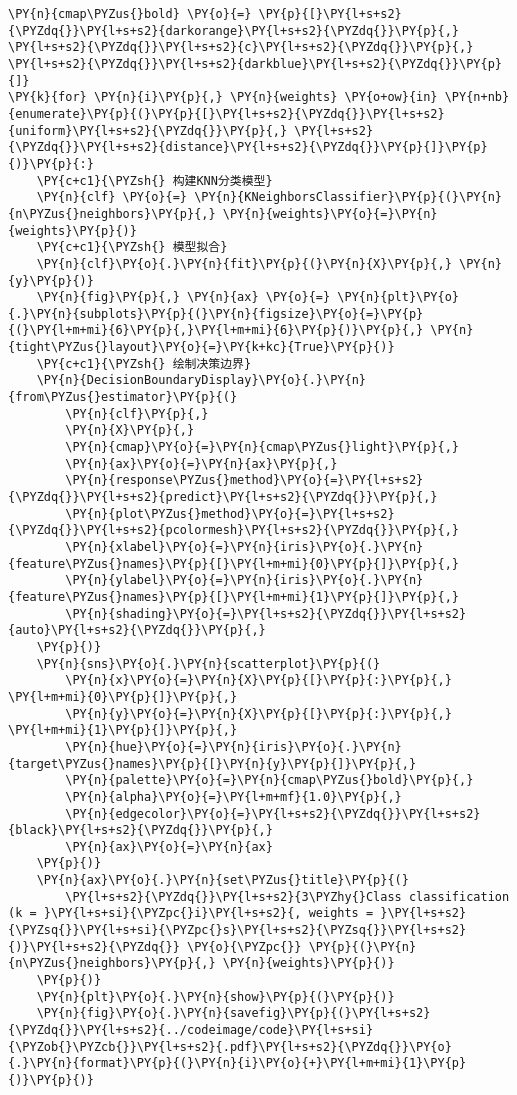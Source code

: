 \begin{Verbatim}[commandchars=\\\{\}]
\PY{n}{cmap\PYZus{}bold} \PY{o}{=} \PY{p}{[}\PY{l+s+s2}{\PYZdq{}}\PY{l+s+s2}{darkorange}\PY{l+s+s2}{\PYZdq{}}\PY{p}{,} \PY{l+s+s2}{\PYZdq{}}\PY{l+s+s2}{c}\PY{l+s+s2}{\PYZdq{}}\PY{p}{,} \PY{l+s+s2}{\PYZdq{}}\PY{l+s+s2}{darkblue}\PY{l+s+s2}{\PYZdq{}}\PY{p}{]}
\PY{k}{for} \PY{n}{i}\PY{p}{,} \PY{n}{weights} \PY{o+ow}{in} \PY{n+nb}{enumerate}\PY{p}{(}\PY{p}{[}\PY{l+s+s2}{\PYZdq{}}\PY{l+s+s2}{uniform}\PY{l+s+s2}{\PYZdq{}}\PY{p}{,} \PY{l+s+s2}{\PYZdq{}}\PY{l+s+s2}{distance}\PY{l+s+s2}{\PYZdq{}}\PY{p}{]}\PY{p}{)}\PY{p}{:}
    \PY{c+c1}{\PYZsh{} 构建KNN分类模型}
    \PY{n}{clf} \PY{o}{=} \PY{n}{KNeighborsClassifier}\PY{p}{(}\PY{n}{n\PYZus{}neighbors}\PY{p}{,} \PY{n}{weights}\PY{o}{=}\PY{n}{weights}\PY{p}{)}
    \PY{c+c1}{\PYZsh{} 模型拟合}
    \PY{n}{clf}\PY{o}{.}\PY{n}{fit}\PY{p}{(}\PY{n}{X}\PY{p}{,} \PY{n}{y}\PY{p}{)}
    \PY{n}{fig}\PY{p}{,} \PY{n}{ax} \PY{o}{=} \PY{n}{plt}\PY{o}{.}\PY{n}{subplots}\PY{p}{(}\PY{n}{figsize}\PY{o}{=}\PY{p}{(}\PY{l+m+mi}{6}\PY{p}{,}\PY{l+m+mi}{6}\PY{p}{)}\PY{p}{,} \PY{n}{tight\PYZus{}layout}\PY{o}{=}\PY{k+kc}{True}\PY{p}{)}
    \PY{c+c1}{\PYZsh{} 绘制决策边界}
    \PY{n}{DecisionBoundaryDisplay}\PY{o}{.}\PY{n}{from\PYZus{}estimator}\PY{p}{(}
        \PY{n}{clf}\PY{p}{,}
        \PY{n}{X}\PY{p}{,}
        \PY{n}{cmap}\PY{o}{=}\PY{n}{cmap\PYZus{}light}\PY{p}{,}
        \PY{n}{ax}\PY{o}{=}\PY{n}{ax}\PY{p}{,}
        \PY{n}{response\PYZus{}method}\PY{o}{=}\PY{l+s+s2}{\PYZdq{}}\PY{l+s+s2}{predict}\PY{l+s+s2}{\PYZdq{}}\PY{p}{,}
        \PY{n}{plot\PYZus{}method}\PY{o}{=}\PY{l+s+s2}{\PYZdq{}}\PY{l+s+s2}{pcolormesh}\PY{l+s+s2}{\PYZdq{}}\PY{p}{,}
        \PY{n}{xlabel}\PY{o}{=}\PY{n}{iris}\PY{o}{.}\PY{n}{feature\PYZus{}names}\PY{p}{[}\PY{l+m+mi}{0}\PY{p}{]}\PY{p}{,}
        \PY{n}{ylabel}\PY{o}{=}\PY{n}{iris}\PY{o}{.}\PY{n}{feature\PYZus{}names}\PY{p}{[}\PY{l+m+mi}{1}\PY{p}{]}\PY{p}{,}
        \PY{n}{shading}\PY{o}{=}\PY{l+s+s2}{\PYZdq{}}\PY{l+s+s2}{auto}\PY{l+s+s2}{\PYZdq{}}\PY{p}{,}
    \PY{p}{)}
    \PY{n}{sns}\PY{o}{.}\PY{n}{scatterplot}\PY{p}{(}
        \PY{n}{x}\PY{o}{=}\PY{n}{X}\PY{p}{[}\PY{p}{:}\PY{p}{,} \PY{l+m+mi}{0}\PY{p}{]}\PY{p}{,}
        \PY{n}{y}\PY{o}{=}\PY{n}{X}\PY{p}{[}\PY{p}{:}\PY{p}{,} \PY{l+m+mi}{1}\PY{p}{]}\PY{p}{,}
        \PY{n}{hue}\PY{o}{=}\PY{n}{iris}\PY{o}{.}\PY{n}{target\PYZus{}names}\PY{p}{[}\PY{n}{y}\PY{p}{]}\PY{p}{,}
        \PY{n}{palette}\PY{o}{=}\PY{n}{cmap\PYZus{}bold}\PY{p}{,}
        \PY{n}{alpha}\PY{o}{=}\PY{l+m+mf}{1.0}\PY{p}{,}
        \PY{n}{edgecolor}\PY{o}{=}\PY{l+s+s2}{\PYZdq{}}\PY{l+s+s2}{black}\PY{l+s+s2}{\PYZdq{}}\PY{p}{,}
        \PY{n}{ax}\PY{o}{=}\PY{n}{ax}
    \PY{p}{)}
    \PY{n}{ax}\PY{o}{.}\PY{n}{set\PYZus{}title}\PY{p}{(}
        \PY{l+s+s2}{\PYZdq{}}\PY{l+s+s2}{3\PYZhy{}Class classification (k = }\PY{l+s+si}{\PYZpc{}i}\PY{l+s+s2}{, weights = }\PY{l+s+s2}{\PYZsq{}}\PY{l+s+si}{\PYZpc{}s}\PY{l+s+s2}{\PYZsq{}}\PY{l+s+s2}{)}\PY{l+s+s2}{\PYZdq{}} \PY{o}{\PYZpc{}} \PY{p}{(}\PY{n}{n\PYZus{}neighbors}\PY{p}{,} \PY{n}{weights}\PY{p}{)}
    \PY{p}{)}
    \PY{n}{plt}\PY{o}{.}\PY{n}{show}\PY{p}{(}\PY{p}{)}
    \PY{n}{fig}\PY{o}{.}\PY{n}{savefig}\PY{p}{(}\PY{l+s+s2}{\PYZdq{}}\PY{l+s+s2}{../codeimage/code}\PY{l+s+si}{\PYZob{}\PYZcb{}}\PY{l+s+s2}{.pdf}\PY{l+s+s2}{\PYZdq{}}\PY{o}{.}\PY{n}{format}\PY{p}{(}\PY{n}{i}\PY{o}{+}\PY{l+m+mi}{1}\PY{p}{)}\PY{p}{)}
\end{Verbatim}
